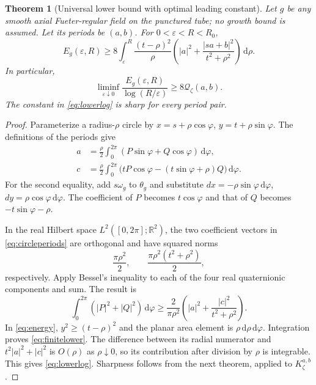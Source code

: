 \documentclass[11pt,a4paper]{article}
\numberwithin{equation}{section}
\newtheorem{theorem}{Theorem}[section]
\theoremstyle{definition}
\theoremstyle{remark}
\newcommand{\R}{\mathbb R}
\newcommand{\dd}{\,\mathrm d}
\newcommand{\qf}{\mathcal Q}
\begin{document}
\begin{theorem}[Universal lower bound with optimal leading constant]
\label{thm:lowerenergy}
Let $g$ be any smooth axial Fueter-regular field on the punctured tube;
no growth bound is assumed. Let its periods be $(a,b)$. For
$0<\varepsilon<R<R_0$,
\begin{equation}
 E_g(\varepsilon,R)\geq
 8\int_\varepsilon^R\frac{(t-\rho)^2}{\rho}
 \left(|a|^2+\frac{|sa+b|^2}{t^2+\rho^2}\right)\dd\rho.
 \label{eq:finitelower}
\end{equation}
In particular,
\begin{equation}
 \liminf_{\varepsilon\downarrow0}
 \frac{E_g(\varepsilon,R)}{\log(R/\varepsilon)}
 \geq8\qf_\zeta(a,b).
 \label{eq:lowerlog}
\end{equation}
The constant in \eqref{eq:lowerlog} is sharp for every period pair.
\end{theorem}
\begin{proof}
Parameterize a radius-$\rho$ circle by
$x=s+\rho\cos\varphi$, $y=t+\rho\sin\varphi$.
The definitions of the periods give
\begin{align}
 a&=\frac\rho2\int_0^{2\pi}
       (P\sin\varphi+Q\cos\varphi)\dd\varphi,\\
 c&=\frac\rho2\int_0^{2\pi}
       \big(tP\cos\varphi-(t\sin\varphi+\rho)Q\big)\dd\varphi.
 \label{eq:circleperiods}
\end{align}
For the second equality, add $s\omega_g$ to $\theta_g$ and substitute
$dx=-\rho\sin\varphi\dd\varphi$, $dy=\rho\cos\varphi\dd\varphi$.
The coefficient of $P$ becomes $t\cos\varphi$ and that of $Q$ becomes
$-t\sin\varphi-\rho$.

In the real Hilbert space $L^2([0,2\pi];\R^2)$, the two coefficient
vectors in \eqref{eq:circleperiods} are orthogonal and have squared norms
\[
 \frac{\pi\rho^2}{2},\qquad
 \frac{\pi\rho^2(t^2+\rho^2)}{2},
\]
respectively. Apply Bessel's inequality to each of the four real
quaternionic components and sum. The result is
\begin{equation}
 \int_0^{2\pi}(|P|^2+|Q|^2)\dd\varphi
 \geq\frac{2}{\pi\rho^2}
       \left(|a|^2+\frac{|c|^2}{t^2+\rho^2}\right).
 \label{eq:circlelower}
\end{equation}
In \eqref{eq:energy}, $y^2\geq(t-\rho)^2$ and the planar area element
is $\rho\dd\rho\dd\varphi$. Integration proves
\eqref{eq:finitelower}. The difference between its radial numerator and
$t^2|a|^2+|c|^2$ is $O(\rho)$ as $\rho\downarrow0$, so its contribution
after division by $\rho$ is integrable. This gives \eqref{eq:lowerlog}.
Sharpness follows from the next theorem, applied to $K_\zeta^{a,b}$.
\end{proof}
\end{document}
